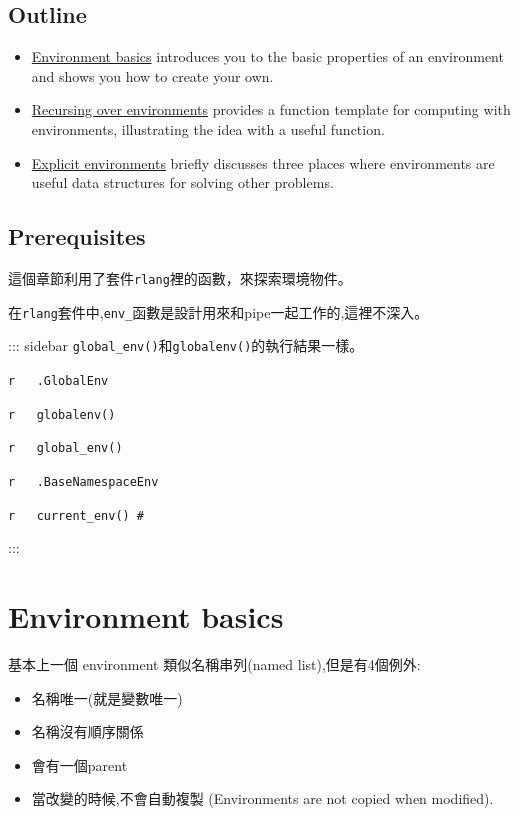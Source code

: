 \documentclass[]{book}
\providecommand{\tightlist}{%
  \setlength{\itemsep}{0pt}\setlength{\parskip}{0pt}}
\theoremstyle{definition}
\theoremstyle{definition}
\theoremstyle{definition}
\theoremstyle{remark}
\begin{document}
\subsection*{Outline}\label{outline-1}

\begin{itemize}
\item
  \protect\hyperlink{env-basics}{Environment basics} introduces you to
  the basic properties of an environment and shows you how to create
  your own.
\item
  \protect\hyperlink{env-recursion}{Recursing over environments}
  provides a function template for computing with environments,
  illustrating the idea with a useful function.
\item
  \protect\hyperlink{explicit-envs}{Explicit environments} briefly
  discusses three places where environments are useful data structures
  for solving other problems.
\end{itemize}

\subsection*{Prerequisites}\label{prerequisites}

這個章節利用了套件\texttt{rlang}裡的函數，來探索環境物件。

在\texttt{rlang}套件中,\texttt{env\_}函數是設計用來和pipe一起工作的,這裡不深入。

::: sidebar \texttt{global\_env()}和\texttt{globalenv()}的執行結果一樣。

\texttt{r\ \ \ .GlobalEnv}

\texttt{r\ \ \ globalenv()}

\texttt{r\ \ \ global\_env()}

\texttt{r\ \ \ .BaseNamespaceEnv}

\texttt{r\ \ \ current\_env()\ \#}

:::

\hypertarget{env-basics}{\section{Environment basics}\label{env-basics}}

基本上一個 environment 類似名稱串列(named list),但是有4個例外:

\begin{itemize}
\tightlist
\item
  名稱唯一(就是變數唯一)\\
\item
  名稱沒有順序關係\\
\item
  會有一個parent\\
\item
  當改變的時候,不會自動複製 (Environments are not copied when modified).
\end{itemize}
\end{document}
